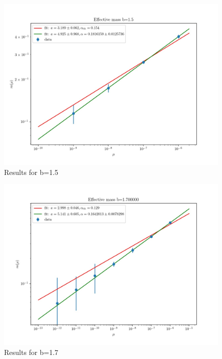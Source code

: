 \documentclass[12pt,a4paper]{report}
\begin{document}
\begin{figure}
\centering
\includegraphics[width=1.0\textwidth]{b1_5}
\caption{Results for b=1.5}
\label{fig:mass_scaling_b1.5}
\end{figure}

\begin{figure}
\centering
\includegraphics[width=1.0\textwidth]{b1_7}
\caption{Results for b=1.7}
\label{fig:mass_scaling_b1.7}
\end{figure}
  
\end{document}
